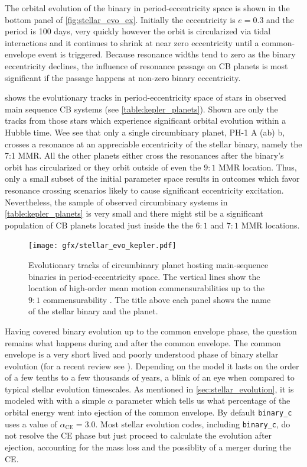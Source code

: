 \documentclass[ twoside,openright,titlepage,numbers=noenddot,headinclude,%
                footinclude=true,cleardoublepage=empty,abstractoff, %
                BCOR=5mm,paper=a4,fontsize=11pt,%
                american,%
                ]{scrreprt}
\begin{document}
The orbital evolution of the binary in period-eccentricity space is shown 
in the bottom panel of \cref{fig:stellar_evo_ex}. 
Initially the eccentricity is $e=0.3$ and the period is 100 days, 
very quickly however the orbit is circularized via tidal 
interactions and it continues to shrink at near zero eccentricity until
a common-envelope event is triggered. Because resonance widths tend to 
zero as the binary eccentricity declines, the influence of resonance
passage on CB planets is most significant if the passage happens
at non-zero binary eccentricity. 

 shows the 
evolutionary tracks in period-eccentricity space of stars in observed 
 main sequence CB systems (see \cref{table:kepler_planets}). 
 Shown are only the tracks
from those stars which experience significant orbital evolution within a 
Hubble time. Wee see that only a single circumbinary planet, PH-1 A (ab) b,
crosses a resonance at an appreciable eccentricity of the stellar binary,
namely the 7:1 MMR. All the other planets either cross the resonances
after the binary's orbit has circularized or they orbit outside of even
the $9:1$ MMR location. Thus, only a small subset of the initial parameter
space results in outcomes which favor resonance crossing scenarios likely
to cause significant eccentricity excitation. Nevertheless, the sample of 
observed circumbinary systems in \cref{table:kepler_planets} is very small 
and there might stil be a significant population of CB planets 
located just inside the the $6:1$ and $7:1$ MMR locations.
\begin{figure}[htb]
\centering
\texttt{[image: gfx/stellar\_evo\_kepler.pdf]}
\caption{Evolutionary tracks of circumbinary planet hosting main-sequence
    binaries in period-eccentricity space. The vertical lines show the location
     of high-order mean motion commensurabilities up to the $9:1$ commensurability
     . The title above each panel
     shows the name of the stellar binary and the planet.}
\label{fig:stellar_evo_kepler}
\end{figure}

Having covered binary evolution up to the common envelope phase, the question
remains what happens during and after the common envelope.
The common envelope is a very short lived and poorly understood phase of 
binary stellar evolution (for a recent review see \cite{Ivanova2013}). 
Depending on the model it lasts on the order of a few
tenths to a few thousands of years, a blink of an eye when compared to 
typical stellar evolution timescales. 
As mentioned in \cref{sec:stellar_evolution}, it is modeled with 
with a simple $\alpha$ parameter which tells us what percentage of the orbital 
energy went into ejection of the common envelope. By default 
\texttt{binary\_c} uses a value of $\alpha_\text{CE}=3.0$. Most stellar evolution codes,
including \texttt{binary\_c}, do not resolve the CE phase but just proceed to
calculate the evolution after ejection, accounting for the mass loss and the 
possiblity of a merger during the CE. 
\end{document}
